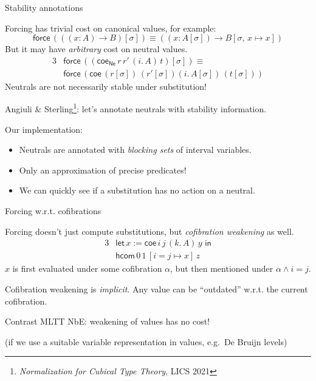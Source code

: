 \documentclass[dvipsnames]{beamer}
\newcommand{\ms}[1]{\mathsf{#1}}
\newcommand{\coe}{\mathsf{coe}}
\newcommand{\hcom}{\ms{hcom}}
\newcommand{\force}{\ms{force}}
\begin{document}
\begin{frame}{Stability annotations}

Forcing has trivial cost on canonical values, for example:
  \[ \force\,(((x : A) \to B)[\sigma]) \equiv ((x : A[\sigma])\to B[\sigma,\,x \mapsto x]) \]
\pause
But it may have \emph{arbitrary} cost on neutral values.
\begin{alignat*}{3}
  & \force\,((\coe_{\ms{Ne}}\,r\,r'\,(i.\,A)\,t)[\sigma]) \equiv\\
  & \force\,(\coe\,(r[\sigma])\,(r'[\sigma]) (i.\,A[\sigma])\,(t[\sigma]))
\end{alignat*}
\pause
Neutrals are not necessarily stable under substitution!
\vspace{0.5em}
\pause

Angiuli \& Sterling\footnote<4->{\emph{Normalization for Cubical Type Theory}, LICS 2021}: let's annotate neutrals with stability information.
\vspace{0.5em}
\pause

Our implementation:
\begin{itemize}
  \item Neutrals are annotated with \emph{blocking sets} of interval variables.
  \item Only an approximation of precise predicates!
  \item We can quickly see if a substitution has no action on a neutral.
\end{itemize}

\end{frame}

\begin{frame}{Forcing w.r.t. cofibrations}

Forcing doesn't just compute substitutions, but \emph{cofibration weakening} as well.
\begin{alignat*}{3}
  & \ms{let}\,x := \coe\,i\,j\,(k.\,A)\,y\,\,\ms{in}\\
  & \hcom\,0\,1\,[i = j \mapsto x]\,z
\end{alignat*}
$x$ is first evaluated under some cofibration $\alpha$, but then mentioned under
$\alpha \land i = j$.
\pause
\vspace{1em}

Cofibration weakening is \emph{implicit}. Any value can be ``outdated'' w.r.t.
the current cofibration.
\pause
\vspace{1em}

Contrast MLTT NbE: weakening of values has no cost!

(\footnotesize if we use a suitable variable representation in values, e.g.\ De Bruijn levels)

\end{frame}
\end{document}
